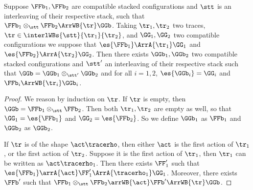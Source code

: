 \begin{lemma}
  \label{c:lift-atrace-wbtrace}
  Suppose $\FFb_1,\FFb_2$ are compatible stacked configurations
  and $\stt$ is an interleaving of their respective stack,
  such that $\FFb_1 \otimes_{\stt} \FFb_2 \ArrWB{\tr} \GGb$.
  Taking $\tr_1,\tr_2$ two traces, $\tr \in \interlWBs{\stt}{\tr_1}{\tr_2}$,
  and $\GG_1,\GG_2$ two compatible \AOGS configurations
  we suppose that $\es{\FFb_1} \ArrA{\tr_1} \GG_1$
  and $\es{\FFb_2} \ArrA{\tr_2} \GG_2$.
% 
  Then there exists $\GGb_1,\GGb_2$ two compatible stacked configurations
  and $\stt'$ an interleaving of their respective stack such that
  $\GGb = \GGb_1 \otimes_{\stt'} \GGb_2$
  and for all $i=1,2$, 
  $\es{\GGb_i} = \GG_i$
  and 
  $\FFb_i \ArrWB{\tr_i} \GGb_i$.
\end{lemma}

\begin{proof}
We reason by induction on $\tr$.
If $\tr$ is empty, then $\GGb = \FFb_1 \otimes_{\stt} \FFb_2$.
Then both $\tr_1,\tr_2$ are empty as well,
so that $\GG_1 = \es{\FFb_1}$ and $\GG_2 = \es{\FFb_2}$.
So we define $\GGb_1$ as $\FFb_1$ and $\GGb_2$ as $\GGb_2$.

If $\tr$ is of the shape $\act \tracerho$,
then either $\act$ is the first action of $\tr_1$, or the first action of $\tr_2$.
Suppose it is the first action of $\tr_1$, then $\tr_1$
can be written as $\act \tracerho_1$.
Then there exists $\FF'_1$ such that 
$\es{\FFb_1} \arrA{\act} \FF'_1 \ArrA{\tracerho_1} \GG_1$.
Moreover, there exists $\FFb'$
such that $\FFb_1 \otimes_{\stt} \FFb_2 \arrWB{\act} \FFb' \ArrWB{\tr} \GGb$.


\end{proof}
